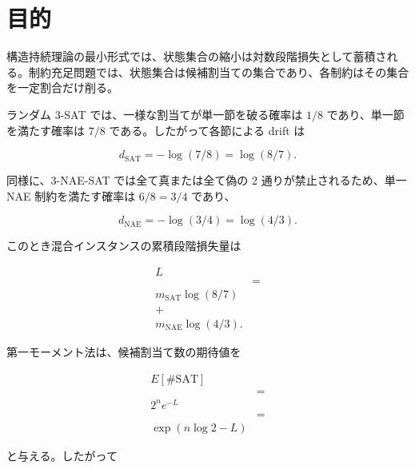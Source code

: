 \documentclass[12pt,a4paper]{article}
\begin{document}
\begin{abstract}
外部再実行については、Mixed-CSP の requested outside-group rerun set が 3 名の外部実行者により 3/3 clean success として完了した。さらに Exp43c q-coloring でも、3 名の外部実行者が同じ frozen package を再実行し、それぞれ 4,000 行、checked core mismatches 0、TIMEOUT 0、MALFORMED 0、および同じ qualitative support decision を返した。したがって仕様固定構造層では、Mixed-CSP と Exp43c q-coloring という二つの frozen package について、著者環境外での 3/3 再実行成功が得られている。ただし、これは仕様固定有限系の empirical package の外部再現性を強めるものであり、非CSP branch や理論全体の普遍法則化を単独で閉じるものではない。
\end{abstract}

\section{目的}\label{ux76eeux7684}

構造持続理論の最小形式では、状態集合の縮小は対数段階損失として蓄積される。制約充足問題では、状態集合は候補割当ての集合であり、各制約はその集合を一定割合だけ削る。

ランダム 3-SAT では、一様な割当てが単一節を破る確率は \(1/8\) であり、単一節を満たす確率は \(7/8\) である。したがって各節による drift は

\[
d_{\mathrm{SAT}}=-\log(7/8)=\log(8/7).
\]

同様に、3-NAE-SAT では全て真または全て偽の 2 通りが禁止されるため、単一 NAE 制約を満たす確率は \(6/8=3/4\) であり、

\[
d_{\mathrm{NAE}}=-\log(3/4)=\log(4/3).
\]

このとき混合インスタンスの累積段階損失量は

\[
\begin{aligned}
L \\
&= \\
m_{\mathrm{SAT}}\log(8/7) \\
+ \\
m_{\mathrm{NAE}}\log(4/3).
\end{aligned}
\]

第一モーメント法は、候補割当て数の期待値を

\[
\begin{aligned}
E[\#\mathrm{SAT}] \\
&= \\
2^n e^{-L} \\
&= \\
\exp(n\log 2-L)
\end{aligned}
\]

と与える。したがって
\end{document}
